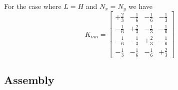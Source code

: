For the case where $L=H$ and $N_{x}=N_{y}$ we have
\begin{equation}
  K_{mn}=\begin{bmatrix}
  +\frac{2}{3} & -\frac{1}{6} & -\frac{1}{6} & -\frac{1}{3} \\
  -\frac{1}{6} & +\frac{2}{3} & -\frac{1}{3} & -\frac{1}{6} \\
  -\frac{1}{6} & -\frac{1}{3} & +\frac{2}{3} & -\frac{1}{6} \\
  -\frac{1}{3} & -\frac{1}{6} & -\frac{1}{6} & +\frac{2}{3}
  \end{bmatrix}
  \label{eqn:FEMTwoDLaplaceRegularElementStiffnessMatrix}  
\end{equation}
 
\subsection{Assembly}
\label{subsec:FEMTwoDLaplaceAssembly}

